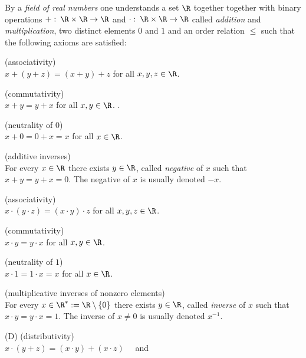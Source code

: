 \begin{definition}
  By  a \emph{field of real numbers} one understands a set $\R$ together together with binary operations 
  $+ : \: \R  \times \R \to \R$ and $\cdot : \: \R  \times \R \to \R$ called \emph{addition} and \emph {multiplication}, 
  two distinct elements $0$ and $1$  and an order relation $\leq$ such that the following axioms 
  are satisfied:
  \begin{axiomlist}[A]
  \item \textup{\sffamily (associativity)}\\
    $ x + (y + z) = (x+y) +z$ for all $x,y,z \in \R$. 
  \item \textup{\sffamily (commutativity)}\\
     $ x + y = y+x$ for all $x,y \in \R$. .  
  \item \textup{\sffamily (neutrality of $0$)}\\ 
     $x +0 = 0 +x = x$ for all $x\in \R$. 
  \item \textup{\sffamily (additive inverses)}\\ 
     For every $x \in \R$ there exists $y \in \R$, called \emph{negative} 
     of $x$ such that $x +y = y +x = 0$. The negative of $x$ is usually denoted $-x$. 
  \end{axiomlist} 
  \begin{axiomlist}[M]
  \item \textup{\sffamily (associativity)}\\
    $ x \cdot (y \cdot z) = (x\cdot y) \cdot z$ for all $x,y,z \in \R$. 
  \item \textup{\sffamily (commutativity)}\\
     $ x \cdot y = y\cdot x$ for all $x,y \in \R$. 
  \item \textup{\sffamily (neutrality of $1$)}\\ 
     $x \cdot 1 = 1 \cdot x = x$ for all $x\in \R$. 
  \item \textup{\sffamily (multiplicative inverses of nonzero elements)}\\ 
     For every $x \in \R^* := \R \setminus \{ 0 \}$ there exists $y \in \R$, called \emph{inverse} 
     of $x$ such that $x \cdot y = y \cdot x = 1$. The inverse of $x \neq 0$ is usually denoted $x^{-1}$.  
  \end{axiomlist} 
  \begin{axiomlist}[D]
  \item[\textup{\sffamily (D) }] \textup{\sffamily (distributivity)}\\ 
       $ x \cdot (y +z ) = (x \cdot y) + (x \cdot z) \quad $ and \\

\end{axiomlist}
\end{definition}
